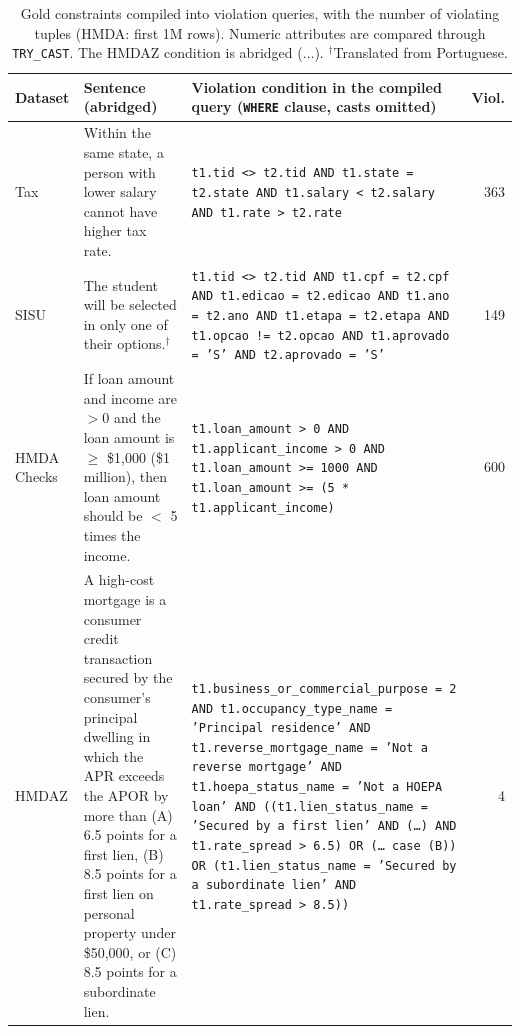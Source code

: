 \begin{table}[t]
  \centering
  \caption{Gold constraints compiled into violation queries, with the number of violating tuples (HMDA: first 1M rows). Numeric attributes are compared through \texttt{TRY\_CAST}. The HMDAZ condition is abridged ($\ldots$). $^{\dagger}$Translated from Portuguese.}
  \label{tab:sql-examples}
  \footnotesize
  \setlength{\tabcolsep}{4pt}
  \begin{tabular}{>{\raggedright\arraybackslash}p{1.6cm}>{\raggedright\arraybackslash}p{4.6cm}>{\raggedright\arraybackslash}p{9.0cm}r}
    \toprule
    \textbf{Dataset} & \textbf{Sentence (abridged)} & \textbf{Violation condition in the compiled query (\texttt{WHERE} clause, casts omitted)} & \textbf{Viol.} \\
    \midrule
    Tax & Within the same state, a person with lower salary cannot have higher tax rate. & \texttt{t1.tid <> t2.tid AND t1.state = t2.state AND t1.salary < t2.salary AND t1.rate > t2.rate} & 363 \\
    SISU & The student will be selected in only one of their options.$^{\dagger}$ & \texttt{t1.tid <> t2.tid AND t1.cpf = t2.cpf AND t1.edicao = t2.edicao AND t1.ano = t2.ano AND t1.etapa = t2.etapa AND t1.opcao != t2.opcao AND t1.aprovado = 'S' AND t2.aprovado = 'S'} & 149 \\
    HMDA Checks & If loan amount and income are $>0$ and the loan amount is $\geq$ \$1,000 (\$1 million), then loan amount should be $<$ 5 times the income. & \texttt{t1.loan\_amount > 0 AND t1.applicant\_income > 0 AND t1.loan\_amount >= 1000 AND t1.loan\_amount >= (5 * t1.applicant\_income)} & 600 \\
    HMDAZ & A high-cost mortgage is a consumer credit transaction secured by the consumer's principal dwelling in which the APR exceeds the APOR by more than (A) 6.5 points for a first lien, (B) 8.5 points for a first lien on personal property under \$50,000, or (C) 8.5 points for a subordinate lien. & \texttt{t1.business\_or\_commercial\_purpose = 2 AND t1.occupancy\_type\_name = 'Principal residence' AND t1.reverse\_mortgage\_name = 'Not a reverse mortgage' AND t1.hoepa\_status\_name = 'Not a HOEPA loan' AND ((t1.lien\_status\_name = 'Secured by a first lien' AND (\ldots) AND t1.rate\_spread > 6.5) OR (\ldots\ \textrm{case (B)}) OR (t1.lien\_status\_name = 'Secured by a subordinate lien' AND t1.rate\_spread > 8.5))} & 4 \\
    \bottomrule
  \end{tabular}
  
\end{table}

